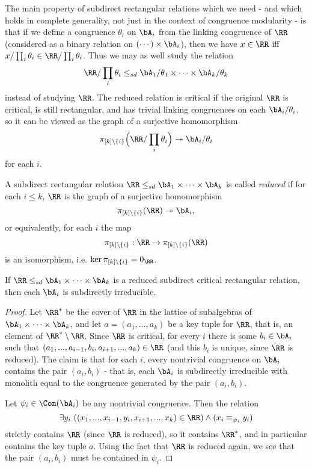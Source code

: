 The main property of subdirect rectangular relations which we need - and which holds in complete generality, not just in the context of congruence modularity - is that if we define a congruence $\theta_i$ on $\bA_i$ from the linking congruence of $\RR$ (considered as a binary relation on $(\cdots)\times \bA_i$), then we have $x \in \RR$ iff $x/\prod_i \theta_i \in \RR/\prod_i \theta_i$. Thus we may as well study the relation
\[
\RR/\prod_i \theta_i \le_{sd} \bA_1/\theta_1 \times \cdots \times \bA_k/\theta_k
\]
instead of studying $\RR$. The reduced relation is critical if the original $\RR$ is critical, is still rectangular, and has trivial linking congruences on each $\bA_i/\theta_i$, so it can be viewed as the graph of a surjective homomorphism
\[
\pi_{[k]\setminus\{i\}}\Big(\RR/\prod_i \theta_i\Big) \twoheadrightarrow \bA_i/\theta_i
\]
for each $i$.

\begin{defn} A subdirect rectangular relation $\RR \le_{sd} \bA_1 \times \cdots \times \bA_k$ is called \emph{reduced} if for each $i \le k$, $\RR$ is the graph of a surjective homomorphism
\[
\pi_{[k]\setminus\{i\}}(\RR) \twoheadrightarrow \bA_i,
\]
or equivalently, for each $i$ the map
\[
\pi_{[k]\setminus \{i\}} : \RR \rightarrow \pi_{[k]\setminus\{i\}}(\RR)
\]
is an isomorphism, i.e. $\ker \pi_{[k]\setminus \{i\}} = 0_\RR$.
\end{defn}

\begin{prop} If $\RR \le_{sd} \bA_1 \times \cdots \times \bA_k$ is a reduced subdirect critical rectangular relation, then each $\bA_i$ is subdirectly irreducible.
\end{prop}
\begin{proof} Let $\RR^*$ be the cover of $\RR$ in the lattice of subalgebras of $\bA_1 \times \cdots \times \bA_k$, and let $a = (a_1, ..., a_k)$ be a key tuple for $\RR$, that is, an element of $\RR^*\setminus \RR$. Since $\RR$ is critical, for every $i$ there is some $b_i \in \bA_i$ such that $(a_1, ..., a_{i-1}, b_i, a_{i+1}, ..., a_k) \in \RR$ (and this $b_i$ is unique, since $\RR$ is reduced). The claim is that for each $i$, every nontrivial congruence on $\bA_i$ contains the pair $(a_i,b_i)$ - that is, each $\bA_i$ is subdirectly irreducible with monolith equal to the congruence generated by the pair $(a_i,b_i)$.

Let $\psi_i \in \Con(\bA_i)$ be any nontrivial congruence. Then the relation
\[
\exists y_i\ ((x_1, ..., x_{i-1}, y_i, x_{i+1}, ..., x_k) \in \RR) \wedge (x_i \equiv_{\psi_i} y_i)
\]
strictly contains $\RR$ (since $\RR$ is reduced), so it contains $\RR^*$, and in particular contains the key tuple $a$. Using the fact that $\RR$ is reduced again, we see that the pair $(a_i,b_i)$ must be contained in $\psi_i$.
\end{proof}

